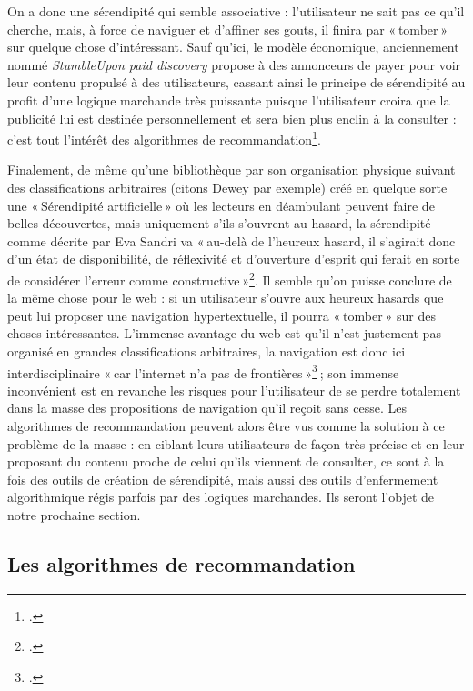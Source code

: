 On a donc une sérendipité qui semble associative : l’utilisateur ne sait pas ce qu’il cherche, mais, à force de naviguer et d’affiner ses gouts, il finira par « tomber » sur quelque chose d’intéressant. Sauf qu’ici, le modèle économique, anciennement nommé \textit{StumbleUpon paid discovery} propose à des annonceurs de payer pour voir leur contenu propulsé à des utilisateurs, cassant ainsi le principe de sérendipité au profit d’une logique marchande très puissante puisque l’utilisateur croira que la publicité lui est destinée personnellement et sera bien plus enclin à la consulter : c’est tout l’intérêt des algorithmes de recommandation\footcite{author2012}.

Finalement, de même qu’une bibliothèque par son organisation physique suivant des classifications arbitraires (citons Dewey par exemple) créé en quelque sorte une « Sérendipité artificielle » où les lecteurs en déambulant peuvent faire de belles découvertes, mais uniquement s’ils s’ouvrent au hasard, la sérendipité comme décrite par Eva Sandri va « au-delà de l’heureux hasard, il s’agirait donc d’un état de disponibilité, de réflexivité et d’ouverture d’esprit qui ferait en sorte de considérer l’erreur comme constructive »\footcite[p. 14]{zotero-221}. Il semble qu’on puisse conclure de la même chose pour le web : si un utilisateur s’ouvre aux heureux hasards que peut lui proposer une navigation hypertextuelle, il pourra « tomber » sur des choses intéressantes. L’immense avantage du web est qu’il n’est justement pas organisé en grandes classifications arbitraires, la navigation est donc ici interdisciplinaire « car l’internet n’a pas de frontières »\footcite[8 minutes 34 secondes]{2015} ; son immense inconvénient est en revanche les risques pour l’utilisateur de se perdre totalement dans la masse des propositions de navigation qu’il reçoit sans cesse. Les algorithmes de recommandation peuvent alors être vus comme la solution à ce problème de la masse : en ciblant leurs utilisateurs de façon très précise et en leur proposant du contenu proche de celui qu’ils viennent de consulter, ce sont à la fois des outils de création de sérendipité, mais aussi des outils d’enfermement algorithmique régis parfois par des logiques marchandes. Ils seront l’objet de notre prochaine section.


\subsection{Les algorithmes de recommandation}



